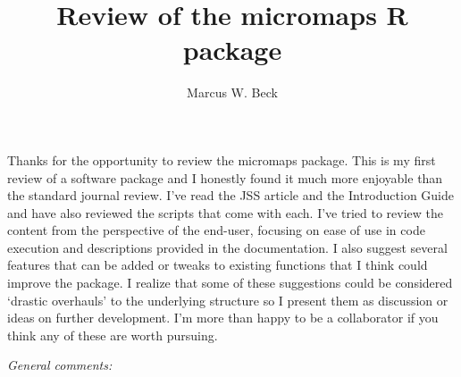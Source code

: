 \documentclass[letterpaper,12pt]{article}\usepackage[]{graphicx}\usepackage[]{color}
\begin{document}
\title{Review of the micromaps R package}
\author{Marcus W. Beck}
\maketitle
\raggedright

Thanks for the opportunity to review the micromaps package.  This is my first review of a software package and I honestly found it much more enjoyable than the standard journal review.  I've read the JSS article and the Introduction Guide and have also reviewed the scripts that come with each.  I've tried to review the content from the perspective of the end-user, focusing on ease of use in code execution and descriptions provided in the documentation.  I also suggest several features that can be added or tweaks to existing functions that I think could improve the package.  I realize that some of these suggestions could be considered `drastic overhauls' to the underlying structure so I present them as discussion or ideas on further development.  I'm more than happy to be a collaborator if you think any of these are worth pursuing.  

{\it General comments:}
\end{document}
